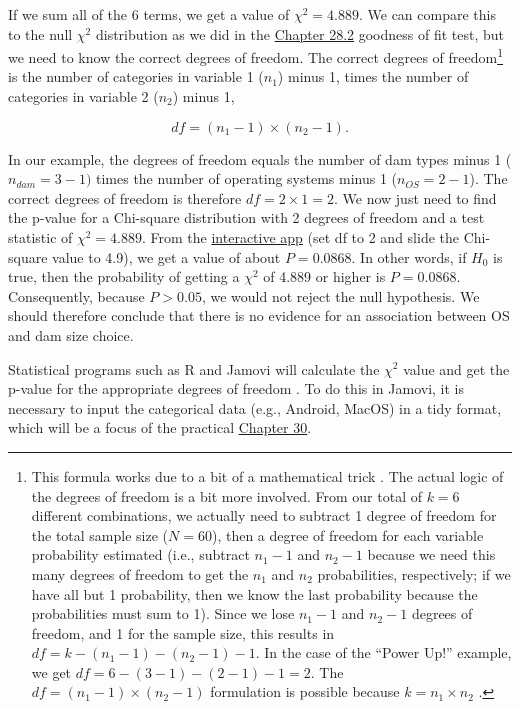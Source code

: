 \documentclass[
]{scrbook}
\begin{document}
If we sum all of the 6 terms, we get a value of \(\chi^{2} = 4.889\).
We can compare this to the null \(\chi^{2}\) distribution as we did in the \protect\hyperlink{chi-squared-goodness-of-fit}{Chapter 28.2} goodness of fit test, but we need to know the correct degrees of freedom.
The correct degrees of freedom\footnote{This formula works due to a bit of a mathematical trick \citep{Sokal1995}. The actual logic of the degrees of freedom is a bit more involved. From our total of \(k = 6\) different combinations, we actually need to subtract 1 degree of freedom for the total sample size (\(N = 60\)), then a degree of freedom for each variable probability estimated (i.e., subtract \(n_{1} - 1\) and \(n_{2} - 1\) because we need this many degrees of freedom to get the \(n_{1}\) and \(n_{2}\) probabilities, respectively; if we have all but 1 probability, then we know the last probability because the probabilities must sum to 1). Since we lose \(n_{1} - 1\) and \(n_{2} - 1\) degrees of freedom, and 1 for the sample size, this results in \(df = k - (n_{1} - 1) - (n_{2} - 1) - 1\). In the case of the ``Power Up!'' example, we get \(df = 6 - (3 - 1) - (2 - 1) - 1 = 2\). The \(df = (n_{1} - 1) \times (n_{2} - 1)\) formulation is possible because \(k = n_{1} \times n_{2}\) \citep{Sokal1995}.} is the number of categories in variable 1 (\(n_{1}\)) minus 1, times the number of categories in variable 2 (\(n_{2}\)) minus 1,

\[df = (n_{1} - 1) \times (n_{2} - 1).\]

In our example, the degrees of freedom equals the number of dam types minus 1 (\(n_{dam} = 3 - 1)\) times the number of operating systems minus 1 (\(n_{OS} = 2 - 1\)).
The correct degrees of freedom is therefore \(df = 2 \times 1 = 2\).
We now just need to find the p-value for a Chi-square distribution with 2 degrees of freedom and a test statistic of \(\chi^{2} = 4.889\).
From the \href{https://bradduthie.shinyapps.io/chi-square/}{interactive app} (set df to 2 and slide the Chi-square value to 4.9), we get a value of about \(P = 0.0868\).
In other words, if \(H_{0}\) is true, then the probability of getting a \(\chi^{2}\) of 4.889 or higher is \(P = 0.0868\).
Consequently, because \(P > 0.05\), we would not reject the null hypothesis.
We should therefore conclude that there is no evidence for an association between OS and dam size choice.

Statistical programs such as R and Jamovi will calculate the \(\chi^{2}\) value and get the p-value for the appropriate degrees of freedom \citep{Jamovi2022, Rproject}.
To do this in Jamovi, it is necessary to input the categorical data (e.g., Android, MacOS) in a tidy format, which will be a focus of the practical \protect\hyperlink{Chapter_30}{Chapter 30}.
\end{document}
